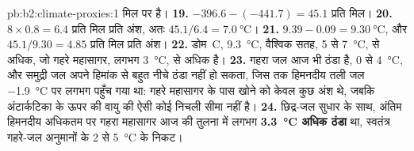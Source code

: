 \begin{solution}{pb:b2:climate-proxies:1}
मिल पर है।
\textbf{19.} $-396.6 - (-441.7) = 45.1$ प्रति मिल।
\textbf{20.} $8 \times 0.8 = 6.4$ प्रति मिल प्रति अंश, अतः $45.1/6.4 = \qty{7.0}{\celsius}$।
\textbf{21.} $9.39 - 0.09 = \qty{9.30}{\celsius}$, और $45.1/9.30 = 4.85$ प्रति मिल प्रति अंश।
\textbf{22.} डोम~C, \qty{9.3}{\celsius}, वैश्विक सतह, 5 से \qty{7}{\celsius}, से अधिक, जो
गहरे महासागर, लगभग \qty{3}{\celsius}, से अधिक है।
\textbf{23.} गहरा जल आज भी ठंडा है, 0 से \qty{4}{\celsius}, और समुद्री जल अपने हिमांक से बहुत
नीचे ठंडा नहीं हो सकता, जिस तक हिमनदीय तली जल \qty{-1.9}{\celsius} पर लगभग पहुँच गया था:
गहरे महासागर के पास खोने को केवल कुछ अंश थे, जबकि अंटार्कटिका के ऊपर की वायु की
ऐसी कोई निचली सीमा नहीं है।
\textbf{24.} छिद्र-जल सुधार के साथ, अंतिम हिमनदीय अधिकतम पर गहरा महासागर आज की तुलना में लगभग \textbf{\qty{3.3}{\celsius}
अधिक ठंडा} था, स्वतंत्र गहरे-जल अनुमानों के 2 से \qty{5}{\celsius} के
निकट।
\end{solution}
